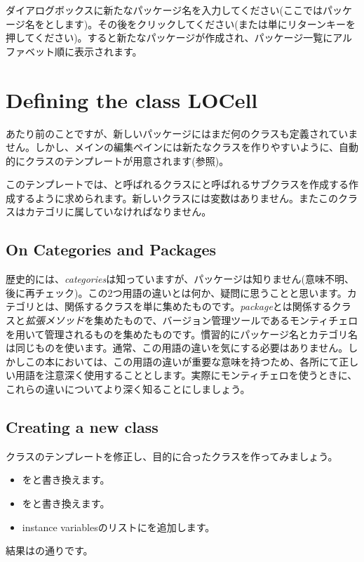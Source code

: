 \documentclass[a4paper,10pt,twoside]{book}
\begin{document}
ダイアログボックスに新たなパッケージ名を入力してください(ここではパッケージ名をとします)。その後をクリックしてください(または単にリターンキーを押してください)。すると新たなパッケージが作成され、パッケージ一覧にアルファベット順に表示されます。

\section{Defining the class LOCell}

あたり前のことですが、新しいパッケージにはまだ何のクラスも定義されていません。しかし、メインの編集ペインには新たなクラスを作りやすいように、自動的にクラスのテンプレートが用意されます(参照)。

このテンプレートでは、と呼ばれるクラスにと呼ばれるサブクラスを作成する作成するように求められます。新しいクラスには変数はありません。またこのクラスはカテゴリに属していなければなりません。

\subsection{On Categories and Packages}

歴史的には、\emph{categories}は知っていますが、パッケージは知りません(意味不明、後に再チェック)。この2つ用語の違いとは何か、疑問に思うことと思います。カテゴリとは、関係するクラスを単に集めたものです。\emph{package}とは関係するクラスと\emph{拡張メソッド}を集めたもので、バージョン管理ツールであるモンティチェロを用いて管理されるものを集めたものです。慣習的にパッケージ名とカテゴリ名は同じものを使います。通常、この用語の違いを気にする必要はありません。しかしこの本においては、この用語の違いが重要な意味を持つため、各所にて正しい用語を注意深く使用することとします。実際にモンティチェロを使うときに、これらの違いについてより深く知ることにしましょう。


\subsection{Creating a new class}

クラスのテンプレートを修正し、目的に合ったクラスを作ってみましょう。

\begin{itemize}
  \item {}をと書き換えます。
  \item {}をと書き換えます。
  \item instance variablesのリストにを追加します。
\end{itemize}
結果はの通りです。
\end{document}
